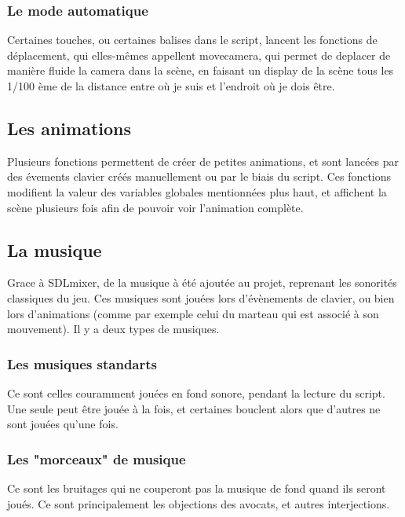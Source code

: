 	\subsubsection{Le mode automatique}
	Certaines touches, ou certaines balises dans le script, lancent les fonctions de déplacement, qui elles-mêmes appellent movecamera, qui permet de deplacer de manière fluide la camera dans la scène, en faisant un display de la scène tous les 1/100 ème de la distance entre où je suis et l'endroit où je dois être.
\subsection{Les animations}
	Plusieurs fonctions permettent de créer de petites animations, et sont lancées par des évements clavier créés manuellement ou par le biais du script. Ces fonctions modifient la valeur des variables globales mentionnées plus haut, et affichent la scène plusieurs fois afin de pouvoir voir l'animation complète.
\subsection{La musique}
	Grace à SDLmixer, de la musique à été ajoutée au projet, reprenant les sonorités classiques du jeu. Ces musiques sont jouées lors d'évènements de clavier, ou bien lors d'animations (comme par exemple celui du marteau qui est associé à son mouvement). Il y a deux types de musiques.
	\subsubsection{Les musiques standarts}
	Ce sont celles couramment jouées en fond sonore, pendant la lecture du script. Une seule peut être jouée à la fois, et certaines bouclent alors que d'autres ne sont jouées qu'une fois.
	\subsubsection{Les "morceaux" de musique}
	Ce sont les bruitages qui ne couperont pas la musique de fond quand ils seront joués. Ce sont principalement les objections des avocats, et autres interjections.
	